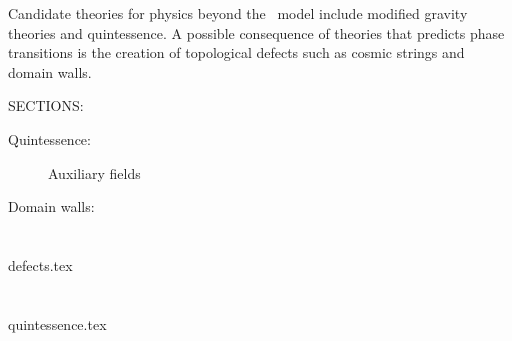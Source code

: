 











Candidate theories for physics beyond the \LCDM~model include modified gravity theories and quintessence. A possible consequence of theories that predicts phase transitions is the creation of topological defects such as cosmic strings and domain walls. 







\begin{bullets}
    \item SECTIONS: %
        \begin{description}
            \item[Quintessence:] Auxiliary fields
            \item[Domain walls:] 
        \end{description}
\end{bullets}









\section{}\label{sec:cosmo:defects}
{{defects.tex}}


\section{}\label{sec:cosmo:quintessence}
{{quintessence.tex}}




